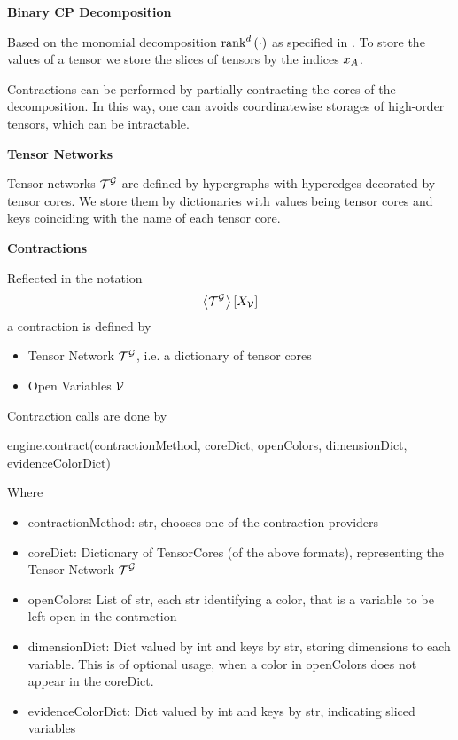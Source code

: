 \textbf{Binary CP Decomposition}

Based on the monomial decomposition $\mathrm{rank}^{d}\left(\cdot\right)$ as specified in .
To store the values of a tensor we store the slices of tensors by the indices $x_{A}$. 

Contractions can be performed by partially contracting the cores of the decomposition.
In this way, one can avoids coordinatewise storages of high-order tensors, which can be intractable.

\textbf{Tensor Networks}

Tensor networks $\mathcal{T}^{\mathcal{G}}$ are defined by hypergraphs with hyperedges decorated by tensor cores. 
We store them by dictionaries with values being tensor cores and keys coinciding with the name of each tensor core.


\textbf{Contractions}

Reflected in the notation
	\[ \left\langle \mathcal{T}^{\mathcal{G}}\right\rangle \left[ X_{\mathcal{V}} \right] \]
a contraction is defined by
\begin{itemize}
	\item Tensor Network $\mathcal{T}^{\mathcal{G}}$, i.e. a dictionary of tensor cores
	\item Open Variables $\mathcal{V}$
\end{itemize}
Contraction calls are done by
\begin{centeredcode}
	engine.contract(contractionMethod, coreDict, openColors, dimensionDict, evidenceColorDict)
\end{centeredcode}
Where
\begin{itemize}
	\item contractionMethod: str, chooses one of the contraction providers
	\item coreDict: Dictionary of TensorCores (of the above formats), representing the Tensor Network $\mathcal{T}^{\mathcal{G}}$ 
	\item openColors: List of str, each str identifying a color, that is a variable to be left open in the contraction
	\item dimensionDict: Dict valued by int and keys by str, storing dimensions to each variable. This is of optional usage, when a color in openColors does not appear in the coreDict.
	\item evidenceColorDict: Dict valued by int and keys by str, indicating sliced variables
\end{itemize}

